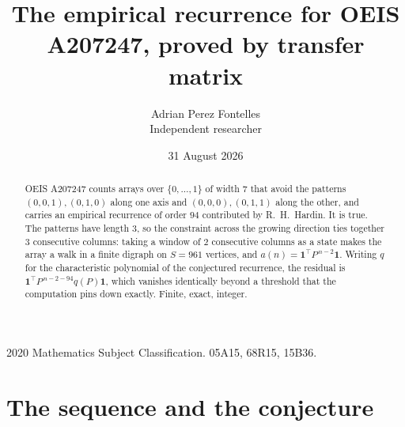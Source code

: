 \documentclass[11pt,a4paper]{article}
\title{The empirical recurrence for OEIS A207247, proved by transfer matrix}
\author{Adrian Perez Fontelles\\ \small Independent researcher}
\date{31 August 2026}
\theoremstyle{plain}
\theoremstyle{definition}
\begin{document}
\maketitle

\begin{abstract}
OEIS A207247 counts arrays over $\{0,\dots,1\}$ of width $7$ that avoid the patterns
$(0,0,1), (0,1,0)$ along one axis and $(0,0,0), (0,1,1)$ along the other, and carries an empirical recurrence of
order $94$ contributed by R.~H.~Hardin. It is true. The patterns have length $3$, so
the constraint across the growing direction ties together $3$ consecutive columns: taking a
window of $2$ consecutive columns as a state makes the array a walk in a finite digraph
on $S=961$ vertices, and $a(n)=\mathbf{1}^{\!\top}P^{\,n-2}\mathbf{1}$. Writing $q$
for the characteristic polynomial of the conjectured recurrence, the residual is
$\mathbf{1}^{\!\top}P^{\,n-2-94}q(P)\mathbf{1}$, which vanishes identically
beyond a threshold that the computation pins down exactly. Finite, exact, integer.
\end{abstract}

\noindent\small 2020 Mathematics Subject Classification. 05A15, 68R15, 15B36.\normalsize

\section{The sequence and the conjecture}
\end{document}
